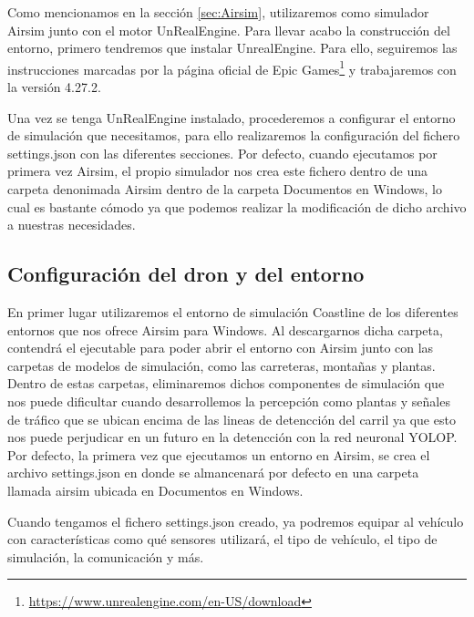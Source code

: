 Como mencionamos en la sección \ref{sec:Airsim}, utilizaremos como simulador Airsim junto con el motor UnRealEngine. Para llevar acabo la construcción del entorno, primero tendremos 
que instalar UnrealEngine. Para ello, seguiremos las instrucciones marcadas por la página oficial de Epic Games\footnote{\url{https://www.unrealengine.com/en-US/download}} y trabajaremos con la versión 4.27.2. 

Una vez se tenga UnRealEngine instalado, procederemos a configurar el entorno de simulación que necesitamos, para ello realizaremos la configuración del fichero settings.json con las diferentes
secciones. Por defecto, cuando ejecutamos por primera vez Airsim, el propio simulador nos crea este fichero dentro de una carpeta denonimada Airsim dentro de la carpeta Documentos en Windows, lo cual
es bastante cómodo ya que podemos realizar la modificación de dicho archivo a nuestras necesidades. 


\subsection{Configuración del dron y del entorno}
\label{subsec:Configuración del dron y del entorno}

En primer lugar utilizaremos el entorno de simulación Coastline de los diferentes entornos que nos ofrece Airsim para Windows. Al descargarnos dicha carpeta, contendrá el ejecutable para
poder abrir el entorno con Airsim junto con las carpetas de modelos de simulación, como las carreteras, montañas y plantas. Dentro de estas carpetas, eliminaremos dichos componentes 
de simulación que nos puede dificultar cuando desarrollemos la percepción como plantas y señales de tráfico que se ubican encima de las lineas de detencción del carril ya que esto nos puede perjudicar
en un futuro en la detencción con la red neuronal YOLOP.\newline
Por defecto, la primera vez que ejecutamos un entorno en Airsim, se crea el archivo settings.json en donde se almancenará por defecto en una carpeta 
llamada airsim ubicada en Documentos en Windows. \newline

Cuando tengamos el fichero settings.json creado, ya podremos equipar al vehículo con características como qué sensores utilizará, 
el tipo de vehículo, el tipo de simulación, la comunicación y más. 

